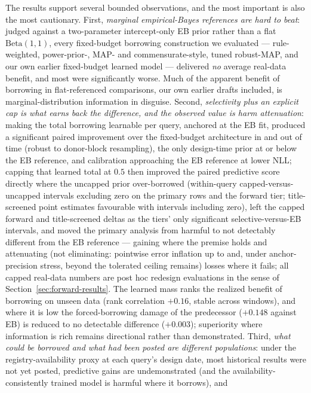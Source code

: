 \documentclass[11pt]{article}
\begin{document}
The results support several bounded observations, and the most important is
also the most cautionary. First, \emph{marginal empirical-Bayes references are
hard to beat}: judged against a two-parameter intercept-only EB prior rather
than a flat $\mathrm{Beta}(1,1)$, every fixed-budget borrowing construction we
evaluated --- rule-weighted, power-prior-, MAP- and commensurate-style, tuned
robust-MAP, and our own earlier fixed-budget learned model --- delivered
\emph{no} average real-data benefit, and most were significantly worse. Much
of the apparent benefit of borrowing in flat-referenced comparisons, our own
earlier drafts included, is marginal-distribution information in disguise.
Second, \emph{selectivity plus an explicit cap is what earns back the
difference, and the observed value is harm attenuation}: making
the total borrowing learnable per query, anchored at the EB fit, produced a
significant paired improvement over the fixed-budget architecture in and out
of time (robust to donor-block resampling), the only design-time prior at or
below the EB reference, and calibration
approaching the EB reference at lower NLL; capping that learned total at
$0.5$ then improved the paired predictive score directly where the
uncapped prior over-borrowed (within-query capped-versus-uncapped
intervals excluding zero on the primary rows and the forward tier;
title-screened point estimates favourable with intervals including
zero), left the capped
forward and title-screened deltas as the tiers' only significant
selective-versus-EB intervals, and moved the primary analysis from
harmful to not detectably different from the EB reference --- gaining where
the premise holds and attenuating (not eliminating: pointwise error
inflation up to and, under anchor-precision stress, beyond the tolerated
ceiling remains) losses where it fails; all capped real-data numbers are
post hoc redesign evaluations in the sense of
Section~\ref{sec:forward-results}. The learned
mass ranks
the realized benefit of borrowing on unseen data (rank correlation $+0.16$,
stable across windows), and where it is low the forced-borrowing damage of
the predecessor ($+0.148$ against EB) is reduced to no detectable
difference ($+0.003$); superiority where information is rich remains directional rather
than demonstrated. Third, \emph{what could be borrowed and what had been
posted are different populations}: under the registry-availability proxy at
each query's design date, most historical results were not yet
posted, predictive gains are undemonstrated (and the
availability-consistently trained model is harmful where it borrows), and
\end{document}
